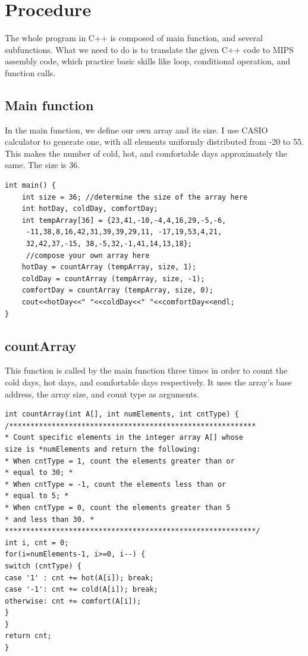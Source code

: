 \documentclass[a4paper,12pt]{article}
\begin{document}
\section{Procedure}
\par The whole program in C++ is composed of main function, and several subfunctions. What we need to do is to translate the given C++ code to MIPS assembly code, which practice basic skills like loop, conditional operation, and function calls.

\subsection{Main function}
\par In the main function, we define our own array and its size. I use CASIO calculator to generate one, with all elements uniformly distributed from -20 to 55. This makes the number of cold, hot, and comfortable days approximately the same. The size is 36.
\lstset{language=C++}
\begin{lstlisting}
int main() {
    int size = 36; //determine the size of the array here
    int hotDay, coldDay, comfortDay;
    int tempArray[36] = {23,41,-10,-4,4,16,29,-5,-6, 
     -11,38,8,16,42,31,39,39,29,11, -17,19,53,4,21,
     32,42,37,-15, 38,-5,32,-1,41,14,13,18}; 
     //compose your own array here
    hotDay = countArray (tempArray, size, 1);
    coldDay = countArray (tempArray, size, -1);
    comfortDay = countArray (tempArray, size, 0);
    cout<<hotDay<<" "<<coldDay<<" "<<comfortDay<<endl;
}
\end{lstlisting}

\subsection{countArray}
\par This function is called by the main function three times in order to count the cold days, hot days, and comfortable days respectively. It uses the array's base address, the array size, and count type as arguments.
\lstset{language=C++}
\begin{lstlisting}
int countArray(int A[], int numElements, int cntType) {
/**********************************************************
* Count specific elements in the integer array A[] whose 
size is *numElements and return the following: 
* When cntType = 1, count the elements greater than or
* equal to 30; *
* When cntType = -1, count the elements less than or 
* equal to 5; *
* When cntType = 0, count the elements greater than 5 
* and less than 30. *
***********************************************************/
int i, cnt = 0;
for(i=numElements-1, i>=0, i--) {
switch (cntType) {
case '1' : cnt += hot(A[i]); break;
case '-1': cnt += cold(A[i]); break;
otherwise: cnt += comfort(A[i]);
}
}
return cnt;
}
\end{lstlisting}
\end{document}
